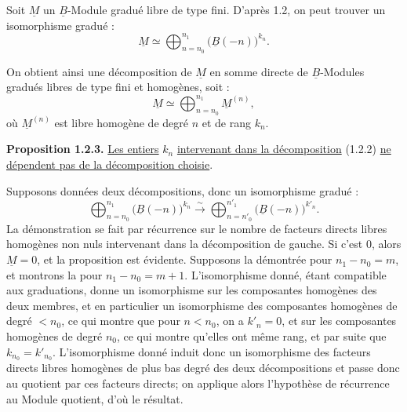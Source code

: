 
Soit \(\underline{M}\) un \(\underline{B}\)-Module gradué libre de type fini. D'après 1.2, on peut trouver un isomorphisme gradué :
\begin{equation}\tag{1.2.2}
  \underline{M}\simeq \bigoplus_{n=n_0}^{n_1} \bigl(\underline{B}(-n)\bigr)^{k_n}.
\end{equation}

On obtient ainsi une décomposition de \(\underline{M}\) en somme directe de \(\underline{B}\)-Modules gradués libres de type fini et homogènes, soit :
\[
  \underline{M}\simeq \bigoplus_{n=n_0}^{n_1}\underline{M}^{(n)},
\]
où \(\underline{M}^{(n)}\) est libre homogène de degré \(n\) et de rang \(k_n\).

\textbf{Proposition 1.2.3.} \uline{Les entiers} \(k_n\) \uline{intervenant dans la décomposition} (1.2.2) \uline{ne dépendent pas de la décomposition choisie}.

Supposons données deux décompositions, donc un isomorphisme gradué :
\[
  \bigoplus_{n=n_0}^{n_1}\bigl(\underline{B}(-n)\bigr)^{k_n}\xrightarrow{\sim}
  \bigoplus_{n=n'_0}^{n'_1}\bigl(\underline{B}(-n)\bigr)^{k'_n}.
\]
La démonstration se fait par récurrence sur le nombre de facteurs directs libres homogènes non nuls intervenant dans la décomposition de gauche. Si c'est \(0\), alors \(\underline{M}=0\), et la proposition est évidente. Supposons la démontrée pour \(n_1-n_0=m\), et montrons la pour \(n_1-n_0=m+1\). L'isomorphisme donné, étant compatible aux graduations, donne un isomorphisme sur les composantes homogènes des deux membres, et en particulier un isomorphisme des composantes homogènes de degré \(<n_0\), ce qui montre que pour \(n<n_0\), on a \(k'_n=0\), et sur les composantes homogènes de degré \(n_0\), ce qui montre qu'elles ont même rang, et par suite que \(k_{n_0}=k'_{n_0}\). L'isomorphisme donné induit donc un isomorphisme des facteurs directs libres homogènes de plus bas degré des deux décompositions et passe donc au quotient par ces facteurs directs; on applique alors l'hypothèse de récurrence au Module quotient, d'où le résultat.

